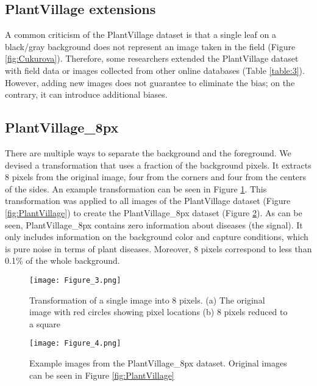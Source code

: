 \documentclass{article}
\begin{document}
\subsection{PlantVillage extensions}

A common criticism\cite{Fenu2021} of the PlantVillage dataset is that a single leaf on a black/gray background does not represent an image taken in the field (Figure \ref{fig:Cukurova}). Therefore, some researchers extended the PlantVillage dataset with field data or images collected from other online databases (Table \ref{table:3}). However, adding new images does not guarantee to eliminate the bias; on the contrary, it can introduce additional biases.



\subsection{PlantVillage\_8px}

There are multiple ways to separate the background and the foreground\cite{Logan2020}. We devised a transformation that uses a fraction of the background pixels. It extracts 8 pixels from the original image, four from the corners and four from the centers of the sides. An example transformation can be seen in Figure \ref{fig:Transformation}. This transformation was applied to all images of the PlantVillage dataset (Figure \ref{fig:PlantVillage}) to create the PlantVillage\_8px dataset (Figure \ref{fig:PlantVillage8px}). As can be seen, PlantVillage\_8px contains zero information about diseases (the signal). It only includes information on the background color and capture conditions, which is pure noise in terms of plant diseases. Moreover, 8 pixels correspond to less than 0.1\% of the whole background.

\begin{figure}[h]
\centering
\texttt{[image: Figure\_3.png]}
\caption{\label{fig:Transformation}Transformation of a single image into 8 pixels. (a) The original image with red circles showing pixel locations (b) 8 pixels reduced to a square}
\end{figure}

\begin{figure}[h]
\centering
\texttt{[image: Figure\_4.png]}
\caption{\label{fig:PlantVillage8px}Example images from the PlantVillage\_8px dataset. Original images can be seen in Figure \ref{fig:PlantVillage}}
\end{figure}
\end{document}
